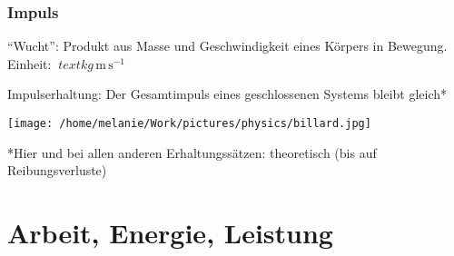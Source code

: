 \documentclass{beamer}
\begin{document}

\begin{frame}
\end{frame}






\begin{frame}
\frametitle{Impuls}

``Wucht'': Produkt aus Masse und Geschwindigkeit eines Körpers in Bewegung. Einheit: \(\
text{kg}\,\text{m}\,\text{s}^{-1}\)

\pause

Impulserhaltung: Der Gesamtimpuls eines geschlossenen Systems bleibt gleich* 

\begin{center}
\texttt{[image: /home/melanie/Work/pictures/physics/billard.jpg]}
\end{center}



 *Hier und bei allen anderen  Erhaltungssätzen: theoretisch (bis auf Reibungsverluste)
\end{frame}













\section{Arbeit, Energie, Leistung}
\end{document}
